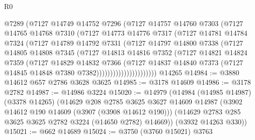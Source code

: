 \begin{lexlean}{R0}
\begin{coremodule}
                      @7289
                      (@7127
                        @14749
                        @14752
                        @7296
                        (@7127
                          @14757
                          @14760
                          @7303
                          (@7127
                            @14765
                            @14768
                            @7310
                            (@7127
                              @14773
                              @14776
                              @7317
                              (@7127
                                @14781
                                @14784
                                @7324
                                (@7127
                                  @14789
                                  @14792
                                  @7331
                                  (@7127
                                    @14797
                                    @14800
                                    @7338
                                    (@7127
                                      @14805
                                      @14808
                                      @7345
                                      (@7127
                                        @14813
                                        @14816
                                        @7352
                                        (@7127
                                          @14821
                                          @14824
                                          @7359
                                          (@7127
                                            @14829
                                            @14832
                                            @7366
                                            (@7127
                                              @14837
                                              @14840
                                              @7373
                                              (@7127 @14845 @14848 @7380 @7382))))))))))))))))))))))
    @14265
@14984 := @3880 @14612 @657 @2786 @3628 @3625
@14985 := @3178 @14609
@14986 := @3178 @2782
@14987 := @14986 @3224
@15020 := @14979
    (@14984
      (@14985 @14987)
      (@3378 @14265)
      (@14629
        @208
        @2785
        @3625
        @3627
        @14609
        @14987
        (@3902 @14612 @190 @14609 (@3907 (@3908 @14612 @190)))
        (@14629 @2783 @285 @3625 @3625 @2782 @3224 (@14650 @2782) @14669))
      (@3932 @14263 @330))
@15021 := @662 @14689
@15024 := @3750 (@3760 @15021) @3763

\end{coremodule}
\end{lexlean}
